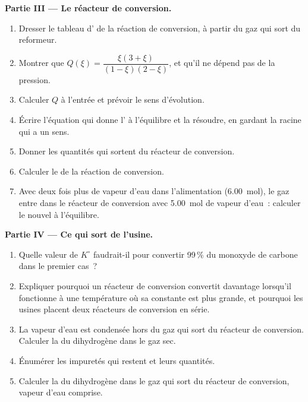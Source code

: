 \begin{problem}
\medskip
\noindent\textbf{Partie III --- Le réacteur de conversion.}
\begin{enumerate}[resume]
  \item Dresser le tableau d' de la réaction de conversion, à
        partir du gaz qui sort du reformeur.
  \item Montrer que $Q(\xi) = \dfrac{\xi(3 + \xi)}{(1 - \xi)(2 - \xi)}$, et
        qu'il ne dépend pas de la pression.
  \item Calculer $Q$ à l'entrée et prévoir le sens d'évolution.
  \item Écrire l'équation qui donne l' à l'équilibre et la
        résoudre, en gardant la racine qui a un sens.
  \item Donner les quantités qui sortent du réacteur de conversion.
  \item Calculer le  de la réaction de conversion.
  \item Avec deux fois plus de vapeur d'eau dans l'alimentation
        (\qty{6.00}{mol}), le gaz entre dans le réacteur de conversion
        avec \qty{5.00}{mol} de vapeur d'eau~: calculer le nouvel
         à l'équilibre.
\end{enumerate}

\medskip
\noindent\textbf{Partie IV --- Ce qui sort de l'usine.}
\begin{enumerate}[resume]
  \item Quelle valeur de $K^\circ$ faudrait-il pour convertir 99\,\% du
        monoxyde de carbone dans le premier cas~?
  \item Expliquer pourquoi un réacteur de conversion convertit davantage
        lorsqu'il fonctionne à une température où sa constante est plus
        grande, et pourquoi les usines placent deux réacteurs de
        conversion en série.
  \item La vapeur d'eau est condensée hors du gaz qui sort du réacteur de
        conversion. Calculer la  du dihydrogène dans le
        gaz sec.
  \item Énumérer les impuretés qui restent et leurs quantités.
  \item Calculer la  du dihydrogène dans le gaz qui sort
        du réacteur de conversion, vapeur d'eau comprise.
\end{enumerate}
\end{problem}
